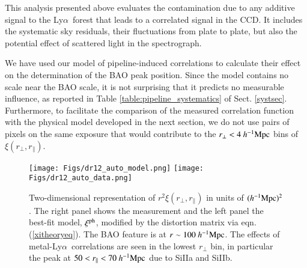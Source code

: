 \documentclass{aa}
\newcommand{\xicosmo}{\xi^{\rm ph}}
\newcommand{\xif}{\xi}
\newcommand{\hMpc}{h^{-1}{\rm Mpc}}
\newcommand{\Lya}{Ly$\alpha$~}
\newcommand{\rperp}{r_\perp}
\newcommand{\rpar}{r_\parallel}
\begin{document}
This analysis presented above evaluates the contamination 
due to any additive signal to the \Lya forest that leads to a 
correlated signal in the CCD. It includes the systematic sky residuals, 
their fluctuations from plate to plate, but also the potential effect of 
scattered light in the spectrograph.

We have used our model of pipeline-induced correlations to
calculate their effect on the determination of the BAO peak
position.  Since the model contains no scale near the BAO scale,
it is not surprising that it predicts no measurable
influence, as reported in Table \ref{table:pipeline_systematics}
of Sect. \ref{systsec}.
Furthermore,
to facilitate the comparison of the measured correlation function
with the physical model developed in the next section,
we do not use pairs of pixels on the same
exposure that would contribute to the $\rperp<4~\hMpc$ bins of
$\xif(\rperp,\rpar)$.


\begin{figure*}[t]
\centering
\texttt{[image: Figs/dr12\_auto\_model.png]}
\texttt{[image: Figs/dr12\_auto\_data.png]}
\caption{
  Two-dimensional representation of 
  $r^2\xi(\rperp,\rpar)$ in units of $(\hMpc)^2$.
  The right panel shows the measurement
  and the left panel the best-fit model, $\xicosmo$,
  modified by
  the distortion matrix via
  eqn. (\ref{xitheoryeq}).
  The BAO feature is at
  $r\sim100~\hMpc$.  The effects of metal-\Lya correlations are seen
  in the lowest $\rperp$ bin, in particular the peak at $50<\rpar<70~\hMpc$
  due to SiIIa and SiIIb.}
\label{2dmodelfig}
\end{figure*}
\end{document}
